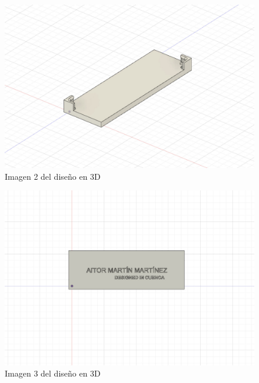 \begin{figure}[tbp]
\centering
\includegraphics[scale = 0.2]{fig/Imagen_2_diseno_3D.jpeg}
\caption{Imagen 2 del diseño en 3D}
\label{fig:imagen-2-diseno-3d}
\end{figure}

\begin{figure}[tbp]
\centering
\includegraphics[scale = 0.2]{fig/Imagen_3_diseno_3D.jpeg}
\caption{Imagen 3 del diseño en 3D}
\label{fig:imagen-3-diseno-3d}
\end{figure}

